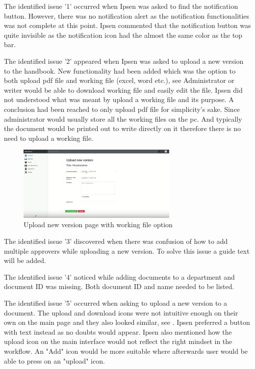 The identified issue '1' occurred when Ipsen was asked to find the notification button. However, there was no notification alert as the notification functionalities was not complete at this point. 
Ipsen commented that the notification button was quite invisible as the notification icon had the almost the same color as the top bar.

The identified issue '2' appeared when Ipsen was asked to upload a new version to the handbook. 
New functionality had been added which was the option to both upload pdf file and working file (excel, word etc.), see 
Administrator or writer would be able to download working file and easily edit the file. 
Ipsen did not understood what was meant by upload a working file and its purpose.
A conclusion had been reached to only upload pdf file for simplicity's sake. 
Since administrator would usually store all the working files on the pc. 
And typically the document would be printed out to write directly on it therefore there is no need to upload a working file. 

\begin{figure}[H]
	\centering
		\includegraphics[width=0.7\textwidth]{billeder/WorkingFile.png}
	\caption{Upload new version page with working file option}\label{fig:WorkingFile}
\end{figure}

The identified issue '3' discovered when there was confusion of how to add multiple approvers while uploading a new version.
To solve this issue a guide text will be added. 

The identified issue '4' noticed while adding documents to a department and document ID was missing. 
Both document ID and name needed to be listed.

The identified issue '5' occurred when asking to upload a new version to a document. 
The upload and download icons were not intuitive enough on their own on the main page and they also looked similar, see . 
Ipsen preferred a button with text instead as no doubts would appear. 
Ipsen also mentioned how the upload icon on the main interface would not reflect the right mindset in the workflow. 
An "Add" icon would be more suitable where afterwards user would be able to press on an "upload" icon. 

